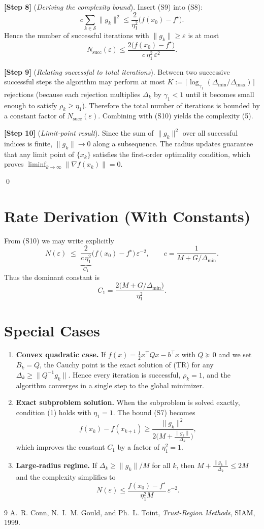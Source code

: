 \documentclass{article}
\begin{document}
\noindent\textbf{[Step 8]} (\emph{Deriving the complexity bound}).  
Insert (S9) into (S8):
\[
c\sum_{k\in\mathcal{S}}\|g_{k}\|^{2}
\le
\frac{2}{\eta_{1}^{2}}\bigl(f(x_{0})-f^{\star}\bigr).
\]
Hence the number of successful iterations with \(\|g_{k}\|\ge\varepsilon\) is at most
\[
N_{\text{succ}}(\varepsilon)
\le
\frac{2\bigl(f(x_{0})-f^{\star}\bigr)}
     {c\,\eta_{1}^{2}\,\varepsilon^{2}}.
\tag{S10}
\]

\noindent\textbf{[Step 9]} (\emph{Relating successful to total iterations}).  
Between two successive successful steps the algorithm may perform at most
\(K:=\bigl\lceil\log_{\gamma_{1}}(\Delta_{\min}/\Delta_{\max})\bigr\rceil\)
rejections (because each rejection multiplies \(\Delta_{k}\) by \(\gamma_{1}<1\)
until it becomes small enough to satisfy \(\rho_{k}\ge\eta_{1}\)).  Therefore
the total number of iterations is bounded by a constant factor of
\(N_{\text{succ}}(\varepsilon)\).  Combining with (S10) yields the
complexity (5).

\noindent\textbf{[Step 10]} (\emph{Limit‑point result}).  
Since the sum of \(\|g_{k}\|^{2}\) over all successful indices is finite,
\(\|g_{k}\|\to0\) along a subsequence.  The radius updates guarantee that any
limit point of \(\{x_{k}\}\) satisfies the first‑order optimality condition,
which proves \(\displaystyle\liminf_{k\to\infty}\|\nabla f(x_{k})\|=0\).

\qed

\section*{Rate Derivation (With Constants)}
From (S10) we may write explicitly
\[
N(\varepsilon)
\;\le\;
\underbrace{\frac{2}{c\,\eta_{1}^{2}}}_{C_{1}}
\bigl(f(x_{0})-f^{\star}\bigr)\,\varepsilon^{-2},
\qquad
c=\frac{1}{M+G/\Delta_{\min}}.
\]
Thus the dominant constant is
\[
C_{1}= \frac{2\bigl(M+G/\Delta_{\min}\bigr)}{\eta_{1}^{2}}.
\]

\section*{Special Cases}
\begin{enumerate}[leftmargin=*]
\item \textbf{Convex quadratic case.}
If \(f(x)=\frac12 x^{\top}Qx-b^{\top}x\) with \(Q\succeq0\) and we set \(B_{k}=Q\),
the Cauchy point is the exact solution of (TR) for any \(\Delta_{k}\ge
\|Q^{-1}g_{k}\|\).  Hence every iteration is successful, \(\rho_{k}=1\), and the
algorithm converges in a single step to the global minimizer.
\item \textbf{Exact subproblem solution.}
When the subproblem is solved exactly, condition (1) holds with
\(\eta_{1}=1\).  The bound (S7) becomes
\[
f(x_{k})-f(x_{k+1})\ge
\frac{\|g_{k}\|^{2}}{2\bigl(M+\frac{\|g_{k}\|}{\Delta_{k}}\bigr)},
\]
which improves the constant \(C_{1}\) by a factor of \(\eta_{1}^{2}=1\).
\item \textbf{Large‑radius regime.}
If \(\Delta_{k}\ge \|g_{k}\|/M\) for all \(k\), then
\(M+\frac{\|g_{k}\|}{\Delta_{k}}\le 2M\) and the complexity simplifies to
\[
N(\varepsilon)\le
\frac{f(x_{0})-f^{\star}}{\eta_{1}^{2}M}\,\varepsilon^{-2}.
\]
\end{enumerate}

\begin{thebibliography}{9}
A.~R. Conn, N.~I.~M. Gould, and Ph.~L. Toint,
\emph{Trust-Region Methods}, 
SIAM, 1999.
\end{thebibliography}
\end{document}
